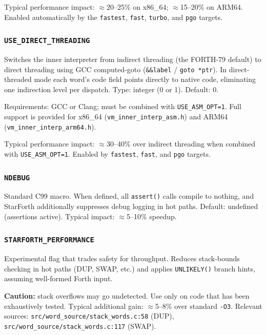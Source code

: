 Typical performance impact: \(\approx\)20--25\% on x86\_64; \(\approx\)15--20\% on ARM64.
Enabled automatically by the \texttt{fastest}, \texttt{fast}, \texttt{turbo}, and \texttt{pgo} targets.

\subsubsection{\texttt{USE\_DIRECT\_THREADING}}

Switches the inner interpreter from indirect threading (the FORTH-79 default)
to direct threading using GCC computed-goto (\texttt{\&\&label} / \texttt{goto *ptr}).
In direct-threaded mode each word's code field points directly to native code,
eliminating one indirection level per dispatch. Type: integer (0 or 1).
Default: 0.

Requirements: GCC or Clang; must be combined with \texttt{USE\_ASM\_OPT=1}.
Full support is provided for x86\_64 (\texttt{vm\_inner\_interp\_asm.h}) and
ARM64 (\texttt{vm\_inner\_interp\_arm64.h}).

Typical performance impact: \(\approx\)30--40\% over indirect threading when
combined with \texttt{USE\_ASM\_OPT=1}. Enabled by \texttt{fastest}, \texttt{fast},
and \texttt{pgo} targets.

\subsubsection{\texttt{NDEBUG}}

Standard C99 macro. When defined, all \texttt{assert()} calls compile to
nothing, and StarForth additionally suppresses debug logging in hot paths.
Default: undefined (assertions active). Typical impact: \(\approx\)5--10\% speedup.

\subsubsection{\texttt{STARFORTH\_PERFORMANCE}}

Experimental flag that trades safety for throughput. Reduces stack-bounds
checking in hot paths (DUP, SWAP, etc.) and applies \texttt{UNLIKELY()} branch
hints, assuming well-formed Forth input.

\textbf{Caution:} stack overflows may go undetected. Use only on code that has
been exhaustively tested. Typical additional gain: \(\approx\)5--8\% over
standard \texttt{-O3}. Relevant sources: \texttt{src/word\_source/stack\_words.c:58}
(DUP), \texttt{src/word\_source/stack\_words.c:117} (SWAP).

